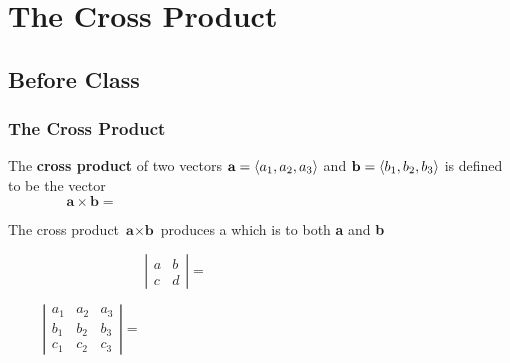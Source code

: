 \documentclass[notes]{subfiles}
\begin{document}
	\fancyhead[LO,RE]{\bfseries \small \currentname}
	\fancyfoot[C]{{}}
	\fancyfoot[RO,LE]{\large \thepage}	%
	
\section*{The Cross Product}\label{cs124}
	\subsection*{Before Class}
	\subsubsection*{The Cross Product}
		\begin{defn}
			The \textbf{cross product} of two vectors $\textbf{a} = \left\langle a_1,a_2,a_3\right\rangle$ and $\textbf{b} = \left\langle b_1,b_2,b_3\right\rangle$ is defined to be the vector\\[15pt]
				\[\textbf{a}\times\textbf{b} = \hspace{4in}\]
		\end{defn}
		
		\begin{rmk}
			The cross product $\textbf{a}\times\textbf{b}$ produces a  which is  to both \textbf{a} and \textbf{b}
		\end{rmk}
		
		\begin{rmk}
			\[\left|\begin{matrix} a & b \\ c & d\end{matrix}\right| = \hspace{2in}\]
		\end{rmk}
		
		\begin{rmk}
			\[
				\left|\begin{matrix} a_1 & a_2 & a_3 \\ b_1 & b_2 & b_3 \\ c_1 & c_2 & c_3 \end{matrix}\right| = \hspace{4in}\]
				\\[15pt]
		\end{rmk}
			\newpage
			
\end{document}
